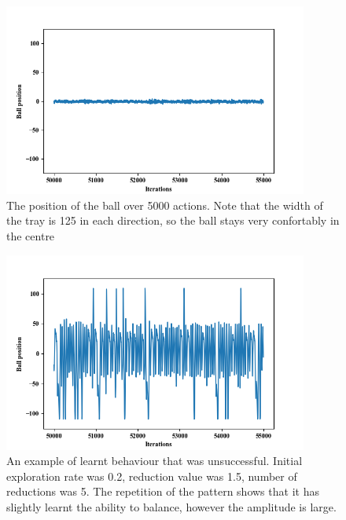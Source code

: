 \documentclass[12pt,a4paper]{article}
\begin{document}
\begin{figure}[H]
	\centering
	\includegraphics[width=10cm]{100_small}
	\caption{The position of the ball over 5000 actions. Note that the width of the tray is 125 in each direction, so the ball stays very confortably in the centre}
	\label{f1}
\end{figure}
\begin{figure}[H]
	\centering
	\includegraphics[width=10cm]{101_small}
	\caption{An example of learnt behaviour that was unsuccessful. Initial exploration rate was 0.2, reduction value was 1.5, number of reductions was 5. The repetition of the pattern shows that it has slightly learnt the ability to balance, however the amplitude is large.}
	\label{f2}
\end{figure}
\end{document}
